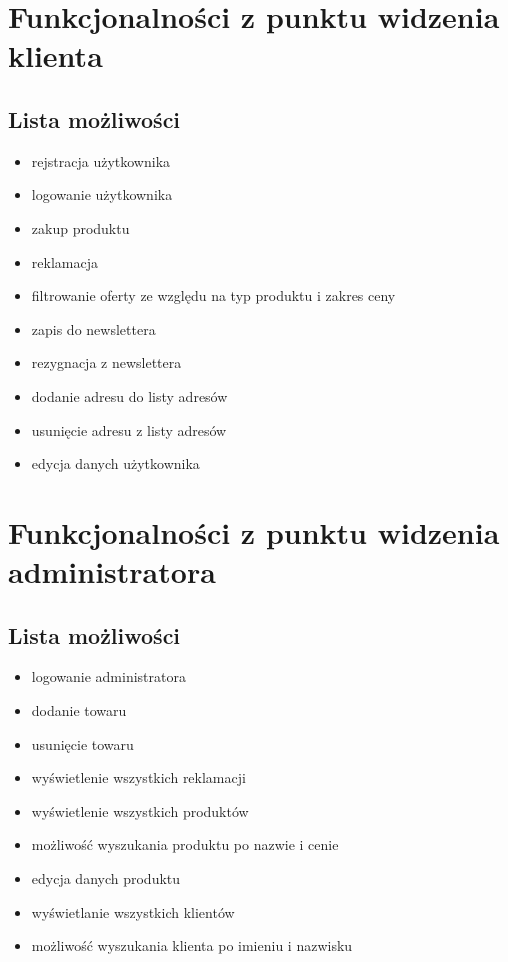 \documentclass[12pt]{report}
\begin{document}
		\section{Funkcjonalności z punktu widzenia klienta}

			\subsection{Lista możliwości}
				\begin{itemize}
					\item rejstracja użytkownika
					\item logowanie użytkownika
					\item zakup produktu
					\item reklamacja
					\item filtrowanie oferty ze względu na typ produktu i zakres ceny
					\item zapis do newslettera
					\item rezygnacja z newslettera
					\item dodanie adresu do listy adresów
					\item usunięcie adresu z listy adresów
					\item edycja danych użytkownika
			\end{itemize}

		\section{Funkcjonalności z punktu widzenia administratora}

		
			\subsection{Lista możliwości}
				\begin{itemize}
					\item logowanie administratora
					\item dodanie towaru
					\item usunięcie towaru
					\item wyświetlenie wszystkich reklamacji
					\item wyświetlenie wszystkich produktów
					\item możliwość wyszukania produktu po nazwie i cenie
					\item edycja danych produktu
					\item wyświetlanie wszystkich klientów
					\item możliwość wyszukania klienta po imieniu i nazwisku
				\end{itemize}
\end{document}
